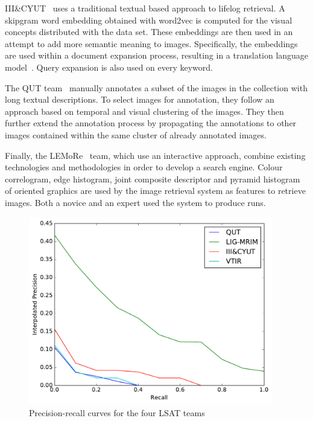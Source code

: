 III\&CYUT~\cite{lin2016image} uses a traditional textual based approach to lifelog retrieval. A skipgram word embedding obtained with word2vec\cite{mikolov2013word2vec} is computed for the visual concepts distributed with the data set. These embeddings are then used in an attempt to add more semantic meaning to images. Specifically, the embeddings are used within a document expansion process, resulting in a translation language model~\cite{zuccon2015integrating}. Query expansion is also used on every keyword.

The QUT team~\cite{scells2016qut} manually annotates a subset of the images in the collection with long textual descriptions. To select images for annotation, they follow an approach based on temporal and visual clustering of the images. They then further extend the annotation process by propagating the annotations to other images contained within the same cluster of already annotated images.

Finally, the LEMoRe~\cite{de40lemore} team, which use an interactive approach, combine existing technologies and methodologies in order to develop a search engine. Colour correlogram, edge histogram, joint composite descriptor and pyramid histogram of oriented graphics are used by the image retrieval system as features to retrieve images. Both a novice and an expert used the system to produce runs.

\begin{figure}[t]
    \centering
    \includegraphics[width=0.95\textwidth]{graphs/ntcir-pr-curve}
    \caption{Precision-recall curves for the four LSAT teams}
    \label{fig:ntcir-results}
\end{figure}

